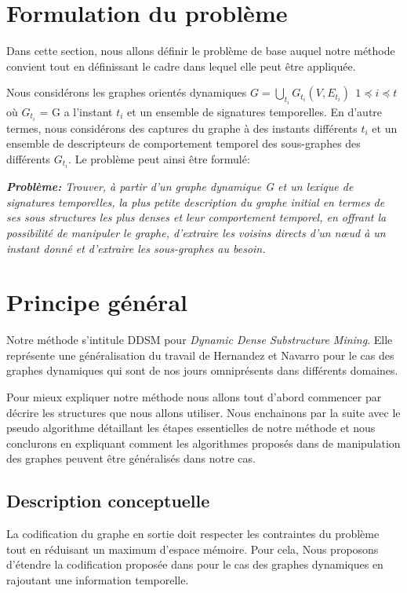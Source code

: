 		\section{Formulation du problème}
		Dans cette section, nous allons définir le problème de base auquel notre méthode convient tout en définissant le cadre dans lequel elle peut être appliquée. 
		
		Nous considérons les graphes orientés dynamiques $\displaystyle{G=\bigcup_{t_{i}}G_{t_{i}}(V,E_{t_{i}})}\ \ 1 \preceq i \preceq t$ où $G_{t_{i}}$ = G a l'instant $t_{i}$ et un ensemble de signatures temporelles. En d'autre termes, nous considérons des captures du graphe à des instants différents $t_{i}$ et un ensemble de descripteurs de comportement temporel des sous-graphes des différents $G_{t_{i}}$. Le problème peut ainsi être formulé:
		
			\textit{\textbf{Problème:}
		Trouver, à partir d'un graphe dynamique G et un lexique de signatures temporelles, la plus petite description du graphe initial en termes de ses sous structures les plus denses et leur comportement temporel, en offrant la possibilité de manipuler le graphe, d'extraire les voisins directs d'un nœud à un instant donné et d'extraire les sous-graphes au besoin. }

		\section{Principe général}
			Notre méthode s'intitule DDSM pour \textit{Dynamic Dense Substructure Mining}. Elle représente une généralisation du travail de Hernandez et Navarro \citep{hernandez2014compressed} pour le cas des graphes dynamiques qui sont de nos jours omniprésents dans différents domaines.
			
			Pour mieux expliquer notre méthode nous allons tout d'abord commencer par décrire les structures que nous allons utiliser. Nous enchainons par la suite  avec le pseudo algorithme détaillant les étapes essentielles de notre méthode et nous conclurons en expliquant comment les algorithmes proposés dans \citep{hernandez2014compressed} de manipulation des graphes peuvent être généralisés dans notre cas.
			\subsection{Description conceptuelle}
			
			La codification du graphe en sortie doit respecter les contraintes du problème tout en réduisant un maximum d'espace mémoire. Pour cela, Nous proposons d'étendre la codification proposée dans \citep{hernandez2014compressed} pour le cas des graphes dynamiques en rajoutant une information temporelle. 
			

